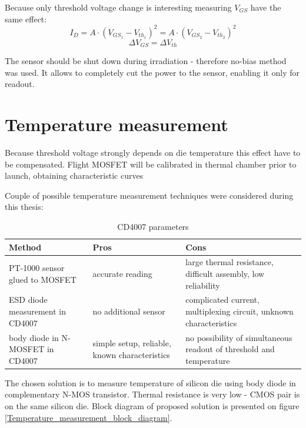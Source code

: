     Because only threshold voltage change is interesting measuring $V_{GS}$ have the same effect:
    $$I_D = A \cdot (V_{GS_1} - V_{th_1})^2 = A \cdot (V_{GS_2} - V_{th_2})^2$$
    $$\Delta V_{GS} = \Delta V_{th}$$

    The sensor should be shut down during irradiation - therefore no-bias method was used. It allows to completely cut the power to the sensor, enabling it only for readout.

\section{Temperature measurement}
    Because threshold voltage strongly depends on die temperature this effect have to be compensated. Flight MOSFET will be calibrated in thermal chamber prior to launch, obtaining characteristic curves 

    Couple of possible temperature measurement techniques were considered during this thesis:
    \begin{table}[H]
    \begin{tabular}{R{4.5cm} | C{5cm} | C{5cm} }
        Method & Pros & Cons \\ \hline
        
        PT-1000 sensor glued to MOSFET & accurate reading & large thermal resistance, difficult assembly, low reliability \\ \hline

        ESD diode measurement in CD4007 & no additional sensor & complicated current, multiplexing circuit, unknown characteristics \\ \hline

        body diode in N-MOSFET in CD4007  & simple setup, reliable, known characteristics & no possibility of simultaneous readout of threshold and temperature
    \end{tabular}
    \caption{CD4007 parameters}
    \label{CD4007_parameters}
    \end{table}

    The chosen solution is to measure temperature of silicon die using body diode in complementary N-MOS transistor. Thermal resistance is very low - CMOS pair is on the same silicon die. Block diagram of proposed solution is presented on figure \ref{Temperature_measurement_block_diagram}.

